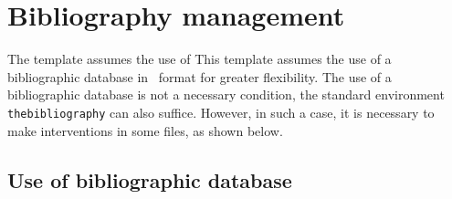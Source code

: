 \chapter{Bibliography management}

The template assumes the use of This template assumes the use of a bibliographic 
database in \BibTeX\ format for greater flexibility. The use of a bibliographic 
database is not a necessary condition, the standard environment 
\texttt{thebibliography} can also suffice. However, in such a case, it is 
necessary to make interventions in some files, as shown below.

\section{Use of bibliographic database}


